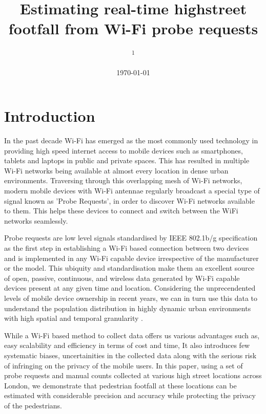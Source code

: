 \documentclass[11t, a4paper, twocolumn]{article}
\title{Estimating real-time highstreet  footfall from Wi-Fi probe requests}
\author{
	\authorstyle{
		Balamurugan Soundararaj\textsuperscript{1}, 
		James Cheshire\textsuperscript{1} and 
		Paul Longley\textsuperscript{1}}
	\newline\newline
	\textsuperscript{1}\institution{
		Department of Geography, 
		University College London, 
		United Kingdom}
}
\date{\today}
\begin{document}
	\maketitle
	\thispagestyle{firstpage}


	\section{Introduction}\label{intro}

		In the past decade Wi-Fi has emerged as the most commonly used technology in providing high speed internet access to mobile devices such as smartphones, tablets and laptops in public and private spaces. This has resulted in multiple Wi-Fi networks being available at almost every location in dense urban environments. Traversing through this overlapping mesh of Wi-Fi networks, modern mobile devices with Wi-Fi antennae regularly broadcast a special type of signal known as 'Probe Requests', in order to discover Wi-Fi networks available to them. This helps these devices to connect and switch between the WiFi networks seamlessly.
		
		Probe requests are low level signals standardised by IEEE 802.1b/g specification as the first step in establishing a Wi-Fi based connection between two devices and is implemented in any Wi-Fi capable device irrespective of the manufacturer or the model. This ubiquity and standardisation make them an excellent source of open, passive, continuous, and wireless data generated by Wi-Fi capable devices present at any given time and location. Considering the unprecendented levels of mobile device ownership in recent years, we can in turn use this data to understand the population distribution in highly dynamic urban environments with high spatial and temporal granularity \citep{freud2015,konto2017}.

		While a Wi-Fi based method to collect data offers us various advantages such as, easy scalability and efficiency in terms of cost and time, It also introduces few systematic biases, uncertainities in the collected data along with the serious risk of infringing on the privacy of the mobile users. In this paper, using a set of probe requests and manual counts collected at various high street locations across London, we demonstrate that pedestrian footfall at these locations can be estimated with considerable precision and accuracy while protecting the privacy of the pedestrians.
\end{document}
